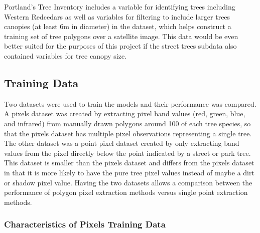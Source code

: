 \documentclass[12pt,twoside]{reedthesis}
\begin{document}
Portland's Tree Inventory includes a variable for identifying trees including Western Redcedars as well as variables for filtering to include larger trees canopies (at least 6m in diameter) in the dataset, which helps construct a training set of tree polygons over a satellite image. This data would be even better suited for the purposes of this project if the street trees subdata also contained variables for tree canopy size.

\hypertarget{training-data}{%
\subsection{Training Data}\label{training-data}}

Two datasets were used to train the models and their performance was compared. A pixels dataset was created by extracting pixel band values (red, green, blue, and infrared) from manually drawn polygons around 100 of each tree species, so that the pixels dataset has multiple pixel observations representing a single tree. The other dataset was a point pixel dataset created by only extracting band values from the pixel directly below the point indicated by a street or park tree. This dataset is smaller than the pixels dataset and differs from the pixels dataset in that it is more likely to have the pure tree pixel values instead of maybe a dirt or shadow pixel value. Having the two datasets allows a comparison between the performance of polygon pixel extraction methods versus single point extraction methods.

\hypertarget{characteristics-of-pixels-training-data}{%
\subsubsection{Characteristics of Pixels Training Data}\label{characteristics-of-pixels-training-data}}
\end{document}
